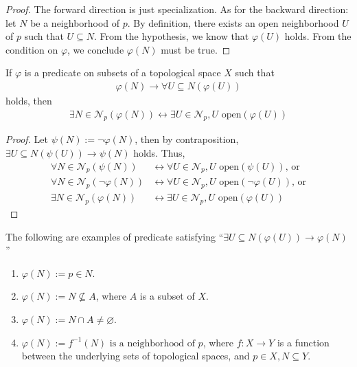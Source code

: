 \documentclass{treatise}
\begin{document}
\begin{proof}
The forward direction is just specialization. As for the backward direction: let $N$ be a neighborhood of $p$. By definition, there exists an open neighborhood $U$ of $p$ such that $U \subseteq N$. From the hypothesis, we know that $\varphi(U)$ holds. From the condition on $\varphi$, we conclude $\varphi(N)$ must be true.
\end{proof}
\begin{corollary}
If $\varphi$ is a predicate on subsets of a topological space $X$ such that
\begin{align*}
    \varphi(N) \to \forall U \subseteq N (\varphi(U))
\end{align*}
holds, then
\begin{align*}
    \exists N \in \mathcal{N}_p (\varphi(N)) \leftrightarrow \exists U \in \mathcal{N}_p, U \mbox{ open} (\varphi(U))
\end{align*}
\end{corollary}
\begin{proof}
Let $\psi(N) := \neg \varphi(N)$, then by contraposition, $\exists U \subseteq N (\psi(U)) \rightarrow \psi(N)$ holds. Thus,
\begin{align*}
    \forall N \in \mathcal{N}_p (\psi(N)) & \leftrightarrow \forall U \in \mathcal{N}_p, U \mbox{ open} (\psi(U)) \mbox{, or}
    \\
    \forall N \in \mathcal{N}_p (\neg\varphi(N)) & \leftrightarrow \forall U \in \mathcal{N}_p, U \mbox{ open} (\neg\varphi(U)) \mbox{, or}
    \\
    \exists N \in \mathcal{N}_p (\varphi(N)) & \leftrightarrow \exists U \in \mathcal{N}_p, U \mbox{ open} (\varphi(U))
\end{align*}
\end{proof}
\begin{example}
The following are examples of predicate satisfying ``$\exists U \subseteq N (\varphi(U)) \to \varphi(N)$''
\begin{enumerate}
    \item $\varphi(N) := p \in N$.
    \item $\varphi(N) := N \not\subseteq A$, where $A$ is a subset of $X$.
    \item $\varphi(N) := N \cap A \neq \varnothing$.
    \item $\varphi(N) := f^{-1}(N) \mbox{ is a neighborhood of } p$, where $f: X \to Y$ is a function between the underlying sets of topological spaces, and $p \in X, N \subseteq Y$.
\end{enumerate}
\end{example}
\end{document}
